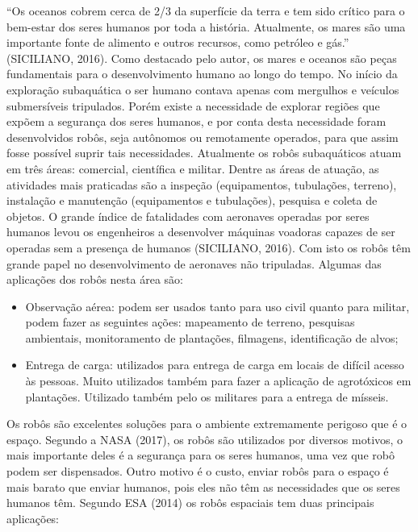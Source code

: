 “Os oceanos cobrem cerca de 2/3 da superfície da terra e tem sido crítico para o bem-estar dos seres humanos por toda a história. Atualmente, os mares são uma importante fonte de alimento e outros recursos, como petróleo e gás.” (SICILIANO, 2016). Como destacado pelo autor, os mares e oceanos são peças fundamentais para o desenvolvimento humano ao longo do tempo. No início da exploração subaquática o ser humano contava apenas com mergulhos e veículos submersíveis tripulados. Porém existe a necessidade de explorar regiões que expõem a segurança dos seres humanos, e por conta desta necessidade foram desenvolvidos robôs, seja autônomos ou remotamente operados,  para que assim fosse possível suprir tais necessidades. Atualmente os robôs subaquáticos atuam em três áreas: comercial, científica e militar. Dentre as áreas de atuação, as atividades mais praticadas são a inspeção (equipamentos, tubulações, terreno), instalação e manutenção (equipamentos e tubulações), pesquisa e coleta de objetos.
O grande índice de fatalidades com aeronaves operadas por seres humanos levou os engenheiros a desenvolver máquinas voadoras capazes de ser operadas sem a presença de humanos (SICILIANO, 2016). Com isto os robôs têm grande papel no desenvolvimento de aeronaves não tripuladas. Algumas das aplicações dos robôs nesta área são:

\begin{itemize}
	\item Observação aérea: podem ser usados tanto para uso civil quanto para militar, podem fazer as seguintes ações: mapeamento de terreno, pesquisas ambientais, monitoramento de plantações, filmagens, identificação de alvos;
	
	\item Entrega de carga: utilizados para entrega de carga em locais de difícil acesso às pessoas. Muito utilizados também para fazer a aplicação de agrotóxicos em plantações. Utilizado também pelo os militares para a entrega de mísseis. 
\end{itemize}

Os robôs são excelentes soluções para o ambiente extremamente perigoso que é o espaço. Segundo a NASA (2017), os robôs são utilizados por diversos motivos, o mais importante deles é a segurança para os seres humanos, uma vez que robô podem ser dispensados. Outro motivo é o custo, enviar robôs para o espaço é mais barato que enviar humanos, pois eles não têm as necessidades que os seres humanos têm. Segundo ESA (2014) os robôs espaciais tem duas principais aplicações: 

